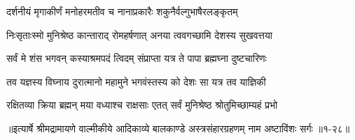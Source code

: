 \twolineshloka
{दर्शनीयं मृगाकीर्णं मनोहरमतीव च}
{नानाप्रकारैः शकुनैर्वल्गुभाषैरलङ्कृतम्} %

\twolineshloka
{निःसृताःस्मो मुनिश्रेष्ठ कान्ताराद् रोमहर्षणात्}
{अनया त्ववगच्छामि देशस्य सुखवत्तया} %

\twolineshloka
{सर्वं मे शंस भगवन् कस्याश्रमपदं त्विदम्}
{संप्राप्ता यत्र ते पापा ब्रह्मघ्ना दुष्टचारिणः} %

\twolineshloka
{तव यज्ञस्य विघ्नाय दुरात्मानो महामुने}
{भगवंस्तस्य को देशः सा यत्र तव याज्ञिकी} %

\twolineshloka
{रक्षितव्या क्रिया ब्रह्मन् मया वध्याश्च राक्षसाः}
{एतत् सर्वं मुनिश्रेष्ठ श्रोतुमिच्छाम्यहं प्रभो} %


॥इत्यार्षे श्रीमद्रामायणे वाल्मीकीये आदिकाव्ये बालकाण्डे अस्त्रसंहारग्रहणम् नाम अष्टाविंशः सर्गः ॥१-२८॥
